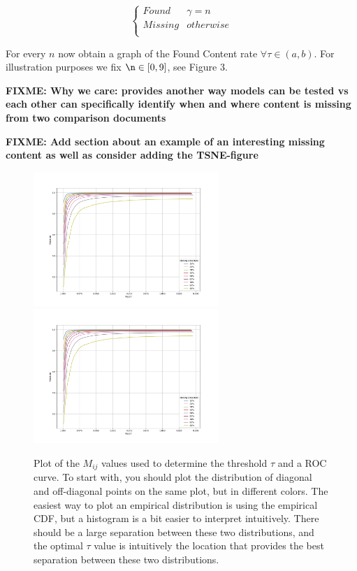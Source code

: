 \documentclass[11pt]{article}
\newcommand{\fixme}[1]{\textbf{FIXME: {#1}}}
\begin{document}
\begin{center}
\[   \left\{
\begin{array}{ll}
      Found & \gamma=n \\
      Missing & otherwise \\
\end{array} 
\right. \]
\end{center}    
For every $n$ now obtain a graph of the Found Content rate $\forall \tau \in (a,b)$. For illustration purposes we fix $\n \in [0,9]$, see Figure 3.    

\fixme{Why we care:
provides another way models can be tested vs each other
can specifically identify when and where content is missing from two comparison documents 
}

\fixme{Add section about an example of an interesting missing content as well as consider adding the TSNE-figure}

   

\begin{figure}
    \centering
    \includegraphics[height=2in]{recall_precision_first_test_zoomed.png}
    \includegraphics[height=2in]{recall_precision_first_test_zoomed.png}
    \caption{
        Plot of the $M_{ij}$ values used to determine the threshold $\tau$ and a ROC curve.
        To start with, you should plot the distribution of diagonal and off-diagonal points on the same plot, but in different colors.
        The easiest way to plot an empirical distribution is using the empirical CDF,
        but a histogram is a bit easier to interpret intuitively.
        There should be a large separation between these two distributions,
        and the optimal $\tau$ value is intuitively the location that provides the best separation between these two distributions.
    }
\end{figure}
\end{document}
